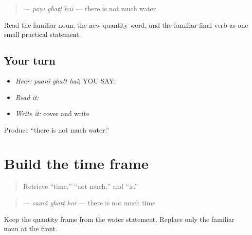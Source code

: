 \begin{grammarlens}[title={Grammar Lens: first complete statement}]
\begin{quote}
\textbf{  } — \emph{pāṇī ghaṭṭ hai} — there is not much water
\end{quote}

Read the familiar noun, the new quantity word, and the familiar final verb as one small practical statement.
\end{grammarlens}

\subsection*{Your turn}
\begin{itemize}
\raggedright
  \item \emph{Hear:} \emph{paani ghatt hai}; YOU SAY: \textbf{  }
  \item \emph{Read it:} \textbf{  }
  \item \emph{Write it:} cover and write \textbf{  }
\end{itemize}

\begin{tcolorbox}[breakable,colback=teal!4,colframe=teal!35!black,title={Before you move on}]
Produce “there is not much water.”
\end{tcolorbox}
\section[\texorpdfstring{\pa{ਸਮਾਂ} \pa{ਘੱਟ} \pa{ਹੈ} (samaa ghatt hai)}{ਸਮਾਂ ਘੱਟ ਹੈ (samaa ghatt hai)}]{Build the time frame}

\label{lesson:PA-C191-samaa-ghatt}



\begin{quote}
Retrieve “time,” “not much,” and “is.”
\end{quote}

\begin{grammarlens}[title={Grammar Lens: complete statement}]
\begin{quote}
\textbf{  } — \emph{samā̃ ghaṭṭ hai} — there is not much time
\end{quote}

Keep the quantity frame from the water statement. Replace only the familiar noun at the front.
\end{grammarlens}

